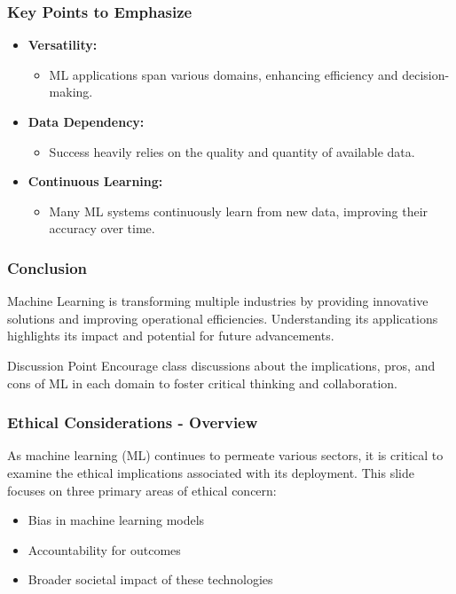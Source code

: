 \documentclass[aspectratio=169]{beamer}
\begin{document}
\begin{frame}[fragile]
    \frametitle{Key Points to Emphasize}
    \begin{itemize}
        \item \textbf{Versatility:} 
        \begin{itemize}
            \item ML applications span various domains, enhancing efficiency and decision-making.
        \end{itemize}

        \item \textbf{Data Dependency:} 
        \begin{itemize}
            \item Success heavily relies on the quality and quantity of available data.
        \end{itemize}

        \item \textbf{Continuous Learning:} 
        \begin{itemize}
            \item Many ML systems continuously learn from new data, improving their accuracy over time.
        \end{itemize}
    \end{itemize}
\end{frame}

\begin{frame}[fragile]
    \frametitle{Conclusion}
    Machine Learning is transforming multiple industries by providing innovative solutions and improving operational efficiencies. Understanding its applications highlights its impact and potential for future advancements.
    
    \begin{block}{Discussion Point}
        Encourage class discussions about the implications, pros, and cons of ML in each domain to foster critical thinking and collaboration.
    \end{block}
\end{frame}

\begin{frame}[fragile]
    \frametitle{Ethical Considerations - Overview}
    As machine learning (ML) continues to permeate various sectors, it is critical to examine the ethical implications associated with its deployment. This slide focuses on three primary areas of ethical concern:
    \begin{itemize}
        \item Bias in machine learning models
        \item Accountability for outcomes
        \item Broader societal impact of these technologies
    \end{itemize}
\end{frame}
\end{document}
